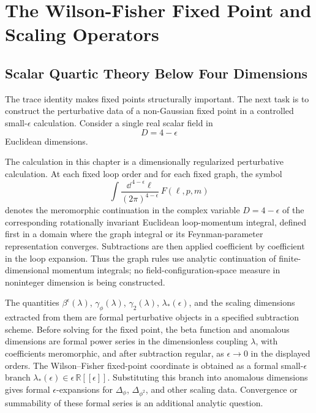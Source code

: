 \chapter{The Wilson-Fisher Fixed Point and Scaling Operators}
\label{ch:volume-ii-wilson-fisher-fixed-point-scaling-operators}
\ConventionsEuclidean


\section{Scalar Quartic Theory Below Four Dimensions}

The trace identity makes fixed points structurally important.  The next task is
to construct the perturbative data of a non-Gaussian fixed point in a
controlled small-\(\epsilon\) calculation.  Consider a single real scalar field in
\[
  D=4-\epsilon
\]
Euclidean dimensions.

\begin{definition}
\label{def:wilson-fisher-dimensional-regularization-status}
The calculation in this chapter is a dimensionally regularized perturbative
calculation.  At each fixed loop order and for each fixed graph, the symbol
\[
  \int \frac{\dd^{\,4-\epsilon}\ell}{(2\pi)^{4-\epsilon}}\,
  F(\ell,p,m)
\]
denotes the meromorphic continuation in the complex variable
\(D=4-\epsilon\) of the corresponding rotationally invariant Euclidean
loop-momentum integral, defined first in a domain where the graph integral or
its Feynman-parameter representation converges.  Subtractions are then applied
coefficient by coefficient in the loop expansion.  Thus the graph rules use
analytic continuation of finite-dimensional momentum integrals; no
field-configuration-space measure in noninteger dimension is being
constructed.

The quantities
\(\beta^\epsilon(\lambda)\), \(\gamma_\phi(\lambda)\),
\(\gamma_2(\lambda)\), \(\lambda_*(\epsilon)\), and the scaling dimensions
extracted from them are formal perturbative objects in a specified
subtraction scheme.  Before solving for the fixed point, the beta function and
anomalous dimensions are formal power series in the dimensionless coupling
\(\lambda\), with coefficients meromorphic, and after subtraction regular, as
\(\epsilon\to0\) in the displayed orders.  The Wilson--Fisher fixed-point
coordinate is obtained as a formal small-\(\epsilon\) branch
\(\lambda_*(\epsilon)\in\epsilon\,\mathbb R[[\epsilon]]\).  Substituting this
branch into anomalous dimensions gives formal \(\epsilon\)-expansions for
\(\Delta_\phi\), \(\Delta_{\phi^2}\), and other scaling data.  Convergence or
summability of these formal series is an additional analytic question.
\end{definition}

